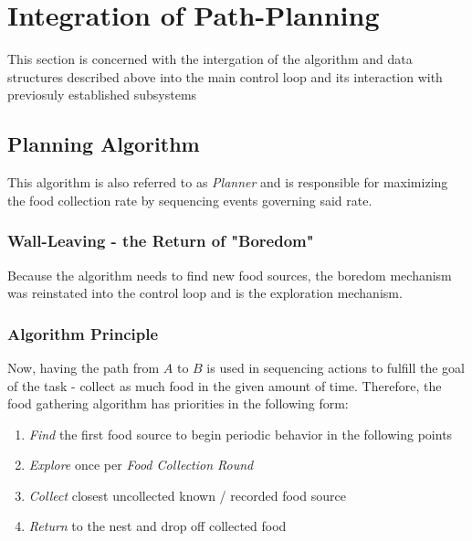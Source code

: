 \documentclass[11pt, a4paper]{article}
\begin{document}




\section{Integration of Path-Planning}

This section is concerned with the intergation of the algorithm and data structures described above into the main control loop and its interaction with previosuly established subsystems\cite{task2_report}

\subsection{Planning Algorithm}

This algorithm is also referred to as \textit{Planner} and is responsible for maximizing the food collection rate by sequencing events governing said rate.

\subsubsection{Wall-Leaving - the Return of "Boredom"}

Because the algorithm needs to find new food sources, the boredom mechanism \cite{task1_report} was reinstated into the control loop and is the exploration mechanism. 

\subsubsection{Algorithm Principle}
\label{Planning Principle}

Now, having the path from $A$ to $B$ is used in sequencing actions to fulfill the goal of the task - collect as much food in the given amount of time. Therefore, the food gathering algorithm has priorities in the following form:

\begin{enumerate}
	\item \textit{Find} the first food source to begin periodic behavior in the following points
	\item \textit{Explore} once per \textit{Food Collection Round}
	\item \textit{Collect} closest uncollected known / recorded food source
	\item \textit{Return} to the nest and drop off collected food
\end{enumerate}
\end{document}
